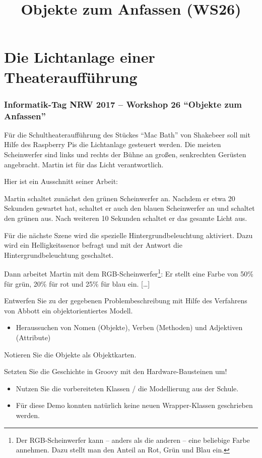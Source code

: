 \documentclass[11pt, a4paper]{scrartcl}
\title{Objekte zum Anfassen (WS26)}
\begin{document}
\section*{Die Lichtanlage einer Theateraufführung}
\subsubsection*{Informatik-Tag NRW 2017 -- Workshop 26 \enquote{Objekte zum Anfassen}}
Für die Schultheateraufführung des Stückes \enquote{Mac Bath} von Shakebeer soll mit Hilfe des Raspberry Pis die Lichtanlage gesteuert werden. Die meisten Scheinwerfer sind links und rechts der Bühne an großen, senkrechten Gerüsten angebracht. Martin ist für das Licht verantwortlich.

\vspace{1em}

Hier ist ein Ausschnitt seiner Arbeit:

\vspace{0.3em}

\begin{mdframed}
	Martin schaltet zunächst den grünen Scheinwerfer an. Nachdem er etwa 20 Sekunden gewartet hat, schaltet er auch den blauen Scheinwerfer an und schaltet den grünen aus. Nach weiteren 10 Sekunden schaltet er das gesamte Licht aus.
	\vspace{1em}

	Für die nächste Szene wird die spezielle Hintergrundbeleuchtung aktiviert. Dazu wird ein Helligkeitssenor befragt und mit der Antwort die Hintergrundbeleuchtung geschaltet.
	\vspace{1em}

	Dann arbeitet Martin mit dem RGB-Scheinwerfer\footnote{Der RGB-Scheinwerfer kann -- anders als die anderen -- eine beliebige Farbe annehmen. Dazu stellt man den Anteil an Rot, Grün und Blau ein.}: Er stellt eine Farbe von 50\% für grün, 20\% für rot und 25\% für blau ein. [\ldots]
\end{mdframed}

\vfill

\begin{aufgabe}
	Entwerfen Sie zu der gegebenen Problembeschreibung mit Hilfe des Verfahrens von Abbott ein objektorientiertes Modell.
	\begin{itemize}
		\item Heraussuchen von Nomen (Objekte), Verben (Methoden) und Adjektiven (Attribute)
	\end{itemize}
\end{aufgabe}

\begin{aufgabe}
	Notieren Sie die Objekte als Objektkarten.
\end{aufgabe}

\begin{aufgabe}
	Setzten Sie die Geschichte in Groovy mit den Hardware-Bausteinen um!
	\begin{itemize}
		\item Nutzen Sie die vorbereiteten Klassen / die Modellierung aus der Schule.
		\item Für diese Demo konnten natürlich keine neuen Wrapper-Klassen geschrieben werden.
	\end{itemize}
\end{aufgabe}
\end{document}
